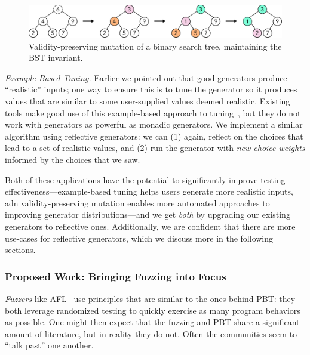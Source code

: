 \begin{figure}[h]
  \centering
  \includegraphics[width=.6\textwidth]{assets/mutate-diagram.pdf}
  \caption{Validity-preserving mutation of a binary search tree, maintaining the
  BST invariant.}\label{fig:mutation}
\end{figure}

{\em Example-Based Tuning.} Earlier we pointed out that good generators
produce ``realistic'' inputs; one way to ensure this is to tune the generator so
it produces values that are similar to some user-supplied values deemed
realistic. Existing tools make good use of this example-based approach to
tuning~\cite{soremekun2020inputs}, but they do not work with generators as
powerful as monadic generators. We implement a similar algorithm using
reflective generators: we can (1) again, reflect on the choices that lead to a
set of realistic values, and (2) run the generator with {\em new choice weights}
informed by the choices that we saw.

Both of these applications have the potential to significantly improve testing
effectiveness---example-based tuning helps users generate more realistic inputs,
adn validity-preserving mutation enables more automated approaches to improving
generator distributions---and we get {\em both} by upgrading our existing
generators to reflective ones. Additionally, we are confident that there are
more use-cases for reflective generators, which we discuss more in the following
sections.

\subsubsection{Proposed Work: Bringing Fuzzing into Focus}
{\em Fuzzers} like AFL~\cite{afl-readme} use principles that are similar to the
ones behind PBT: they both leverage randomized testing to quickly exercise as
many program behaviors as possible.  One might then expect that the fuzzing and
PBT share a significant amount of literature, but in reality they do not. Often
the communities seem to ``talk past'' one another.

